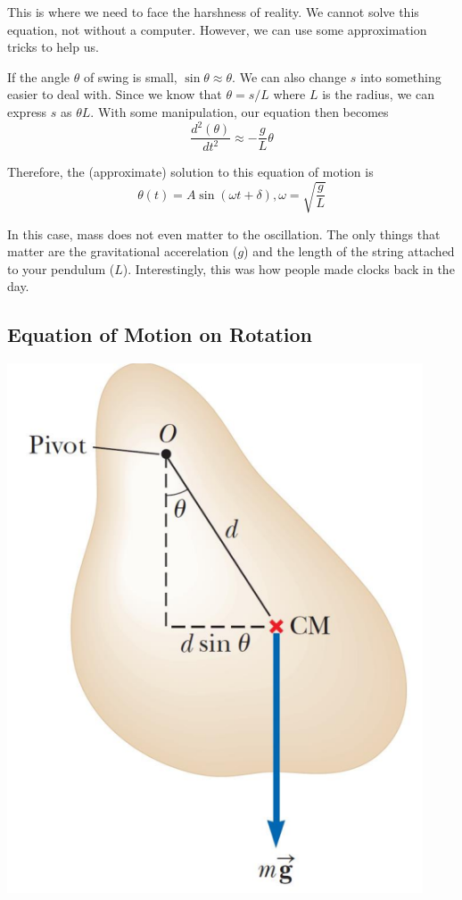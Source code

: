 This is where we need to face the harshness of reality. We cannot solve this equation, not without
a computer. However, we can use some approximation tricks to help us.

If the angle $\theta$ of swing is small, $\sin\theta \approx \theta$. We can also change $s$ into 
something easier to deal with. Since we know that $\theta = s/L$ where $L$ is the radius, we can
express $s$ as $\theta L$. With some manipulation, our equation then becomes
\[ \frac{d^2(\theta)}{dt^2} \approx -\frac{g}{L}\theta \]

Therefore, the (approximate) solution to this equation of motion is
\[ \theta(t) = A\sin(\omega t + \delta), \omega = \sqrt{\frac{g}{L}} \]

In this case, mass does not even matter to the oscillation. The only things that matter are the 
gravitational accerelation ($g$) and the length of the string attached to your pendulum ($L$).
Interestingly, this was how people made clocks back in the day.

\subsection{Equation of Motion on Rotation}

\begin{center}
\includegraphics[scale=0.5]{images/oaw/rotation01.png}
\end{center}

